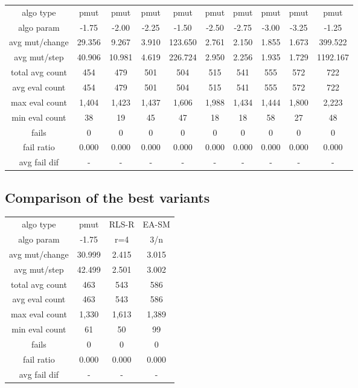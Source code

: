 \begin{tabular}[h]{cccccccccc}
algo type&             pmut&      pmut&      pmut&      pmut&      pmut&      pmut&      pmut&      pmut&      pmut\\
algo param&           -1.75&     -2.00&     -2.25&     -1.50&     -2.50&     -2.75&     -3.00&     -3.25&     -1.25\\
avg mut/change&      29.356&     9.267&     3.910&   123.650&     2.761&     2.150&     1.855&     1.673&   399.522\\
avg mut/step&        40.906&    10.981&     4.619&   226.724&     2.950&     2.256&     1.935&     1.729&  1192.167\\
\hline
total avg count&        454&       479&       501&       504&       515&       541&       555&       572&       722\\
avg eval count&         454&       479&       501&       504&       515&       541&       555&       572&       722\\
max eval count&       1,404&     1,423&     1,437&     1,606&     1,988&     1,434&     1,444&     1,800&     2,223\\
min eval count&          38&        19&        45&        47&        18&        18&        58&        27&        48\\
\hline
fails&                    0&         0&         0&         0&         0&         0&         0&         0&         0\\
fail ratio&           0.000&     0.000&     0.000&     0.000&     0.000&     0.000&     0.000&     0.000&     0.000\\
avg fail dif&             -&         -&         -&         -&         -&         -&         -&         -&         -\\
\end{tabular}


\subsection{Comparison of the best variants}


\begin{tabular}[h]{cccc}
algo type&            pmut&    RLS-R&    EA-SM\\
algo param&          -1.75&      r=4&      3/n\\
avg mut/change&     30.999&    2.415&    3.015\\
avg mut/step&       42.499&    2.501&    3.002\\
\hline
total avg count&       463&      543&      586\\
avg eval count&        463&      543&      586\\
max eval count&      1,330&    1,613&    1,389\\
min eval count&         61&       50&       99\\
\hline
fails&                   0&        0&        0\\
fail ratio&          0.000&    0.000&    0.000\\
avg fail dif&            -&        -&        -\\
\end{tabular}

